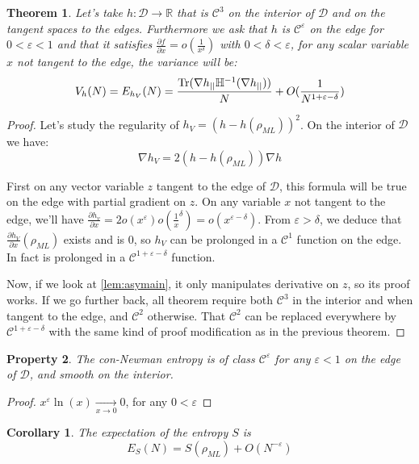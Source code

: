 \documentclass[10pt,a4paper]{report}
\theoremstyle{plain}
\newtheorem{thm}{Theorem}[chapter]
\newtheorem{prop}[thm]{Property}
\newtheorem{cor}{Corollary}[thm]
\theoremstyle{definition}
\theoremstyle{remark}
\newcommand{\R}{\ensuremath{\mathbb{R}}}
\newcommand{\dpar}[2]{\frac{\partial{#1}}{\partial{#2}}}
\DeclareMathOperator{\Tr}{Tr}
\newcommand{\class}[1]{{\mathscr{C}^{#1}}}
\newcommand{\ml}{_{M\!L}}
\begin{document}
\begin{thm}\label{thm:asyvarS}
  Let's take $h : \mathcal{D} \to \R$ that is $\class 3$ on the interior of
  $\mathcal{D}$ and  on the tangent spaces to the edges. Furthermore we ask that
  $h$ is $\class\varepsilon$ on the edge for $0 < \varepsilon < 1$ and that it satisfies
  $\dpar f x = o(\frac1{x^{\delta}})$ with $0 < \delta < \varepsilon$,
  for any scalar variable $x$ not tangent to the edge, the variance will be:
  \[V_h(N) = E_{h_V}(N) = \frac{\Tr(\nabla h\pr \mathbb H\inv(\nabla h\pr))}N
    +O(\frac 1 {N^{1 + \varepsilon - \delta}})\]
\end{thm}

\begin{proof}
  Let's study the regularity of $h_V = {(h - h(\rho\ml))}^2$. On the interior of
  $\mathcal{D}$ we have:
  \[\nabla h_V = 2(h-h(\rho\ml))\nabla h\]

  First on any vector variable $z$ tangent to the edge of $\mathcal{D}$, this formula
  will be true on the edge with partial gradient on $z$. On any variable $x$ not
  tangent to the edge, we'll have $\dpar {h_v} x = 2
  o(x^\varepsilon)o(\frac1x^{\delta}) = o(x^{\varepsilon - \delta})$. From
  $\varepsilon > \delta$, we deduce that
  $\dpar {h_V} x(\rho\ml)$ exists and is $0$, so $h_V$ can be prolonged in a
  $\class 1$ function on the edge. In fact is prolonged in a $\class {1 +
    \varepsilon - \delta}$ function.

  Now, if we look at \cref{lem:asymain}, it only manipulates derivative on $z$,
  so its proof works. If we go further back, all theorem require both $\class 3$
  in the interior and when tangent to the edge, and $\class 2$ otherwise. That
  $\class 2$ can be replaced everywhere by $\class {1 + \varepsilon - \delta}$
  with the same kind of proof modification as in the previous theorem.
\end{proof}

\begin{prop}
The con-Newman entropy is of class $\class \varepsilon$ for any
$\varepsilon < 1$ on the edge of $\mathcal{D}$, and smooth on the interior.
\end{prop}

\begin{proof}
  $x^\varepsilon \ln(x) \xrightarrow[x\to0]{} 0$, for any $0< \varepsilon$
\end{proof}

\begin{cor}
  The expectation of the entropy $S$ is
  \[E_S(N) = S(\rho\ml) + O(N^{-\varepsilon})\]
\end{cor}
\end{document}

